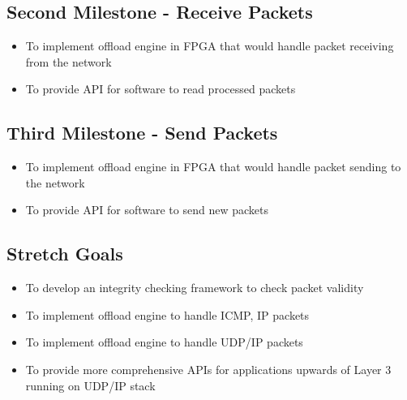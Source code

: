 \documentclass[a4paper,11pt]{scrartcl}
\begin{document}
\subsection{Second Milestone - Receive Packets}
\begin{itemize}
    \item To implement offload engine in FPGA that would handle packet receiving from the network
    \item To provide API for software to read processed packets
\end{itemize}

\subsection{Third Milestone - Send Packets}
\begin{itemize}
    \item To implement offload engine in FPGA that would handle packet sending to the network
    \item To provide API for software to send new packets
\end{itemize}

\subsection{Stretch Goals}
\begin{itemize}
    \item To develop an integrity checking framework to check packet validity
    \item To implement offload engine to handle ICMP, IP packets
    \item To implement offload engine to handle UDP/IP packets
    \item To provide more comprehensive APIs for applications upwards of Layer 3 running on UDP/IP stack
\end{itemize}



\printbibliography[title=References]
\end{document}

